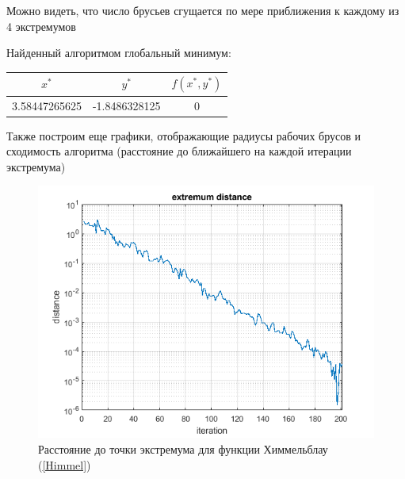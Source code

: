 \documentclass[12pt,a4paper]{article}
\begin{document}
    	        Можно видеть, что число брусьев сгущается по мере приближения к каждому из 4 экстремумов

             Найденный алгоритмом глобальный минимум:
             \begin{center}
                    \begin{tabular}{ |c|c|c| } 
                         \hline
                         $ x^*$ & $y^*$ & $f(x^*,y^*)$ \\ 
                         \hline
                         3.58447265625 & -1.8486328125 & 0 \\ 
                         \hline
                    \end{tabular}
                \end{center}
    	        
    	        Также построим еще графики, отображающие радиусы рабочих брусов и сходимость алгоритма (расстояние до ближайшего на каждой итерации экстремума)
    	        
    	        \begin{figure}[H]
                    \centering
                    \includegraphics[width=13cm]{Himablau_extr_dist.png}
                    \caption{Расстояние до точки экстремума для функции Химмельблау (\ref{Himmel})} \label{fig:Himmel_vizualization}
                \end{figure}
                
\end{document}
